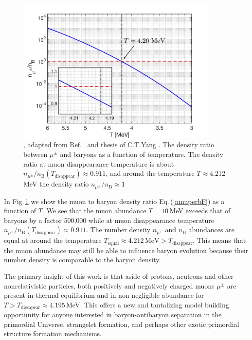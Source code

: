 \begin{figure}
\centerline{\includegraphics[width=0.9\textwidth]{./plots/DensityRatio_new2.jpg}}
\caption{, adapted from Ref.~\cite{Rafelski:2021aey} and thesis of C.T.Yang \cite{Yang:2024ret}.
The density ratio between $\mu^\pm$ and baryons as a function of temperature. The density ratio at muon disappearance temperature is about $n_{\mu^\pm}/n_\mathrm{B}(T_\mathrm{disappear})\approx0.911$, and around the temperature $T\approx4.212$ MeV the density ratio $n_{\mu^\pm}/n_\mathrm{B}\approx1$}
\label{DensityRatio_fig}
\end{figure}

In Fig.\,\ref{DensityRatio_fig} we show the muon to baryon density ratio Eq.\,(\ref{nmuperbF}) as a function of $T$. We see that the muon abundance $T=10$\,MeV exceeds that of baryons by a factor 500,000 while at muon disappearance temperature $n_{\mu^\pm}/n_\mathrm{B}(T_\mathrm{disappear})\approx0.911$. The number density $n_{\mu^\pm}$ and $n_\mathrm{B}$  abundances are equal at around the temperature $T_\mathrm{equal}\approx4.212\,\mathrm{MeV} >  T_\mathrm{disappear}$.  This means that the muon abundance may still be able to influence baryon evolution because their number density is comparable to the baryon density.%

The primary insight of this work is that aside of protons, neutrons and other nonrelativistic particles, both positively and negatively charged muons $\mu^\pm$ are present in thermal equilibrium and in non-negligible abundance for $T>T_\mathrm{dissapear}\approx 4.195$\,MeV. This offers a new and tantalizing model building opportunity for anyone interested in baryon-antibaryon separation in the primordial Universe, strangelet formation, and perhaps other exotic primordial structure formation mechanisms.





